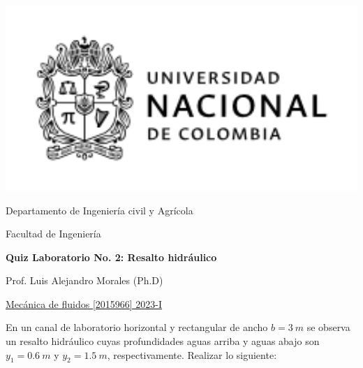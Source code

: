 \documentclass[10pt, letterpaper]{exam}
\begin{document}
	\noindent
	\begin{minipage}[l]{0.1\textwidth}
		\noindent
		\includegraphics[width=2.8\textwidth]{ESCUDO.png}
	\end{minipage}
\hfill
\begin{minipage}[c]{0.8\textwidth}
	\begin{center}
		{\large  Departamento de Ingeniería civil y Agrícola\par
		\large	Facultad de Ingeniería	\par
    \large \textbf{Quiz Laboratorio No. 2: Resalto hidr\'aulico}	\par
} Prof. Luis Alejandro Morales (Ph.D) 
	\end{center}
\end{minipage}
\par
\vspace{0.2in}
\noindent
    \uline{Mecánica de fluidos [2015966]	\hfill 2023-I	}
\par 
\vspace{0.15in}
\noindent

En un canal de laboratorio horizontal y rectangular de ancho $b=3\ m$ se observa un resalto hidr\'aulico  cuyas profundidades aguas arriba y aguas abajo  son $y_1 = 0.6\ m$ y $y_2 = 1.5\ m$, respectivamente. Realizar lo siguiente:

\end{document}
